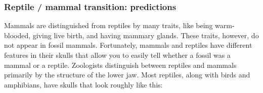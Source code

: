 \documentclass[12pt, hidelinks]{exam}
\begin{document}
\begin{questions}
\begin{center}
\end{center}

\bigskip


\newpage

\subsubsection*{Reptile / mammal transition: predictions}

Mammals are distinguished from reptiles by many traits, like being warm-blooded, giving live birth, and having mammary glands. These traits, however, do not appear in fossil mammals. Fortunately, mammals and reptiles have different features in their skulls that allow you to easily tell whether a fossil was a mammal or a reptile.  Zoologists distinguish between reptiles and mammals primarily by the structure of the lower jaw.  Most reptiles, along with birds and amphibians, have skulls that look roughly like this:


\end{questions}
\end{document}
